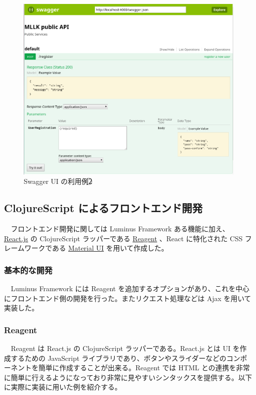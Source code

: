 \documentclass{scrartcl}
\begin{document}
\begin{figure}[htbp]
\centering
\includegraphics[width=15cm]{./swagger-ui-view2.PNG}
\caption{Swagger UI の利用例\textcircled{\scriptsize 2}}
\end{figure}
\newpage
\subsection{ClojureScript によるフロントエンド開発}
\label{sec:org7431a95}
　フロントエンド開発に関しては Luminus Framework ある機能に加え、 \href{https://reactjs.org/}{React.js} の ClojureScript ラッパーである \href{https://reagent-project.github.io/}{Reagent} 、React に特化された CSS フレームワークである \href{http://www.material-ui.com/\#/}{Material UI} を用いて作成した。\\
\subsubsection{基本的な開発}
\label{sec:orgb6fe603}
　Luminus Framework には Reagent を追加するオプションがあり、これを中心にフロントエンド側の開発を行った。またリクエスト処理などは Ajax を用いて実装した。\\
\subsubsection{Reagent}
\label{sec:org514ddf5}
　Reagent は React.js の ClojureScript ラッパーである。React.js とは UI を作成するための JavaScript ライブラリであり、ボタンやスライダーなどのコンポーネントを簡単に作成することが出来る。Reagent では HTML との連携を非常に簡単に行えるようになっており非常に見やすいシンタックスを提供する。以下に実際に実装に用いた例を紹介する。\\
\end{document}
